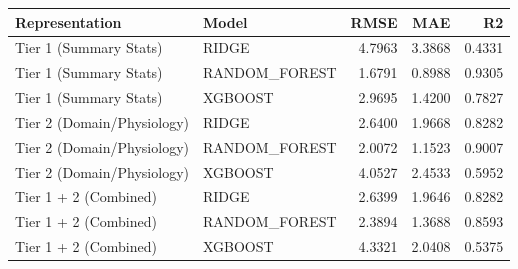 \begin{tabular}{llrrr}
\toprule
Representation & Model & RMSE & MAE & R2 \\
\midrule
Tier 1 (Summary Stats) & RIDGE & 4.7963 & 3.3868 & 0.4331 \\
Tier 1 (Summary Stats) & RANDOM_FOREST & 1.6791 & 0.8988 & 0.9305 \\
Tier 1 (Summary Stats) & XGBOOST & 2.9695 & 1.4200 & 0.7827 \\
Tier 2 (Domain/Physiology) & RIDGE & 2.6400 & 1.9668 & 0.8282 \\
Tier 2 (Domain/Physiology) & RANDOM_FOREST & 2.0072 & 1.1523 & 0.9007 \\
Tier 2 (Domain/Physiology) & XGBOOST & 4.0527 & 2.4533 & 0.5952 \\
Tier 1 + 2 (Combined) & RIDGE & 2.6399 & 1.9646 & 0.8282 \\
Tier 1 + 2 (Combined) & RANDOM_FOREST & 2.3894 & 1.3688 & 0.8593 \\
Tier 1 + 2 (Combined) & XGBOOST & 4.3321 & 2.0408 & 0.5375 \\
\bottomrule
\end{tabular}
